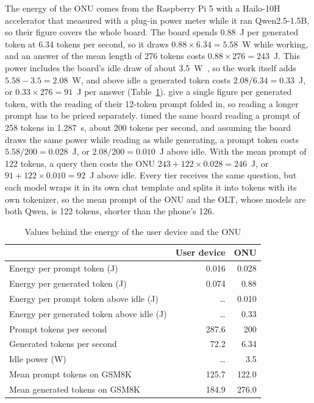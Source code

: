 \documentclass[cic,dipl,english]{infufrgs}
\begin{document}
The energy of the ONU comes from the Raspberry Pi 5 with a Hailo-10H accelerator that
 measured with a plug-in power meter while it ran
Qwen2.5-1.5B, so their figure covers the whole board. The board spends 0.88~J per
generated token at 6.34 tokens per second, so it draws $0.88 \times 6.34 = 5.58$~W while
working, and an answer of the mean length of 276 tokens costs $0.88 \times 276 = 243$~J.
This power includes the board's idle draw of about 3.5~W~\cite{tummalapalli2026edge}, so
the work itself adds $5.58 - 3.5 = 2.08$~W, and above idle a generated token costs
$2.08/6.34 = 0.33$~J, or $0.33 \times 276 = 91$~J per answer (Table~\ref{tab:user-onu}).
 give a single figure per generated token, with the reading
of their 12-token prompt folded in, so reading a longer prompt has to be priced
separately.  timed the same board reading a prompt of
258 tokens in 1.287~s, about 200 tokens per second, and assuming the board draws the same
power while reading as while generating, a prompt token costs $5.58/200 = 0.028$~J, or
$2.08/200 = 0.010$~J above idle. With the mean prompt of 122 tokens, a query then costs
the ONU $243 + 122 \times 0.028 = 246$~J, or $91 + 122 \times 0.010 = 92$~J above idle.
Every tier receives the same question, but each model wraps it in its own chat template and
splits it into tokens with its own tokenizer, so the mean prompt of the ONU and the OLT,
whose models are both Qwen, is 122 tokens, shorter than the phone's 126.

\begin{table}[htb]
  \centering
  \caption{Values behind the energy of the user device and the ONU}
  \label{tab:user-onu}
  \begin{tabular}{lrr}
    \toprule
    & User device & ONU \\
    \midrule
    Energy per prompt token (J) & 0.016 & 0.028 \\
    Energy per generated token (J) & 0.074 & 0.88 \\
    Energy per prompt token above idle (J) & \ldots & 0.010 \\
    Energy per generated token above idle (J) & \ldots & 0.33 \\
    Prompt tokens per second & 287.6 & 200 \\
    Generated tokens per second & 72.2 & 6.34 \\
    Idle power (W) & \ldots & 3.5 \\
    Mean prompt tokens on GSM8K & 125.7 & 122.0 \\
    Mean generated tokens on GSM8K & 184.9 & 276.0 \\
    \bottomrule
  \end{tabular}
\end{table}
\end{document}

